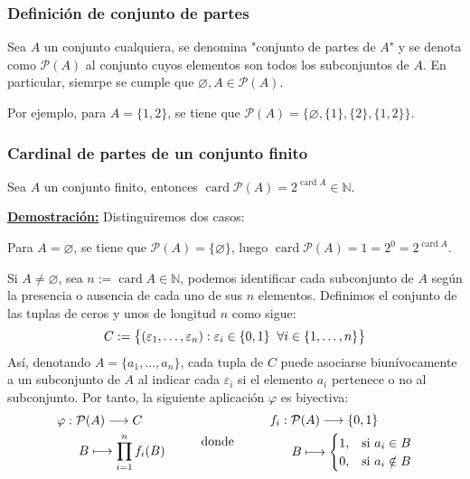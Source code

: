 \documentclass[12pt,a4paper]{article}
\newcommand{\card}{\operatorname{card}}
\newcommand{\N}{\mathbb{N}}
\newcounter{unit}[section]
\renewcommand{\theunit}{\arabic{unit}}
\renewcommand{\thesubsubsection}{\theunit.\arabic{subsubsection}}
\newcommand{\dem}{
    \noindent \underline{\textbf{Demostración:}}
}
\newcommand{\result}[1]{%
  \subsubsection{#1}%
  \label{subsubsection:\thesubsubsection}%
}
\begin{document}
\vspace{6mm}
\result{Definición de conjunto de partes}
\hspace{3mm}
Sea $A$ un conjunto cualquiera, se denomina "conjunto de partes de $A$" y se denota como $\mathcal{P}(A)$
al conjunto cuyos elementos son todos los subconjuntos de $A$. En particular, siemrpe se cumple
que $\varnothing, A \in \mathcal{P}(A)$.

\vspace{2mm} \noindent
Por ejemplo, para $A = \{1,2\}$, se tiene que $\mathcal{P}(A) = \big\{\varnothing, \{1\}, \{2\}, \{1,2\} \big\}$.

\vspace{6mm}
\result{Cardinal de partes de un conjunto finito}
\hspace{3mm}
Sea $A$ un conjunto finito, entonces $\card \mathcal{P}(A) = 2^{\text{} \card A} \in \N$.

\vspace{4mm}
\dem Distinguiremos dos casos:

\vspace{2mm} \noindent
Para $A = \varnothing$, se tiene que $\mathcal{P}(A) = \{\varnothing\}$, luego $\card \mathcal{P}(A) = 1 = 2^0 = 2^{\text{} \card A}$.

\vspace{4mm}
Si $A \neq \varnothing$, sea $n := \card A \in \N$, podemos identificar cada subconjunto de $A$ según la presencia o ausencia de cada uno de sus $n$ elementos.
Definimos el conjunto de las tuplas de ceros y unos de longitud $n$ como sigue:
\vspace{-1ex}
$$C := \big\{(\varepsilon_1 , \ldots, \varepsilon_n) : \varepsilon_i \in \{0,1\} \hspace{2mm} \forall i \in \{1,\ldots,n\}\big\}$$
Así, denotando $A = \{a_1, \ldots, a_n\}$, cada tupla de $C$ puede asociarse biunívocamente a un subconjunto de $A$ al indicar cada
$\varepsilon_i$ si el elemento $a_i$ pertenece o no al subconjunto. Por tanto, la siguiente aplicación $\varphi$ es biyectiva:
\[
\begin{aligned}
    &\varphi : \mathcal{P}(A) \longrightarrow C \\
    &\hspace{6mm} B \longmapsto \prod_{i=1}^{n} f_i(B)
\end{aligned}
\hspace{10mm}
\text{donde}
\hspace{10mm}
\begin{aligned}
    &f_i : \mathcal{P}(A) \longrightarrow \{0,1\} \\
    &\hspace{6mm} B \longmapsto
    \begin{cases}
        1, & \text{si } a_i \in B \\
        0, & \text{si } a_i \notin B
    \end{cases}
\end{aligned}
\]
\end{document}
